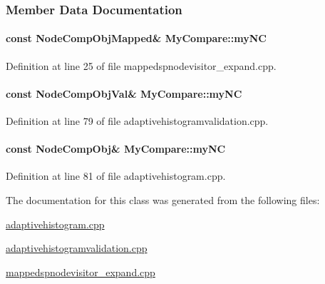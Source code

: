 \subsubsection{\-Member \-Data \-Documentation}
\hypertarget{classMyCompare_aa9f27ea198651dc3a8f2b3aaedc3b2ae}{
\paragraph[{my\-N\-C}]{\setlength{\rightskip}{0pt plus 5cm}const {\bf \-Node\-Comp\-Obj\-Mapped}\& {\bf \-My\-Compare\-::my\-N\-C}}}\label{classMyCompare_aa9f27ea198651dc3a8f2b3aaedc3b2ae}


\-Definition at line 25 of file mappedspnodevisitor\-\_\-expand.\-cpp.

\hypertarget{classMyCompare_aad6bdf9b44e3fbc16faaf3368b764515}{
\paragraph[{my\-N\-C}]{\setlength{\rightskip}{0pt plus 5cm}const {\bf \-Node\-Comp\-Obj\-Val}\& {\bf \-My\-Compare\-::my\-N\-C}}}\label{classMyCompare_aad6bdf9b44e3fbc16faaf3368b764515}


\-Definition at line 79 of file adaptivehistogramvalidation.\-cpp.

\hypertarget{classMyCompare_af0e29031d7490821548f19f8f993b297}{
\paragraph[{my\-N\-C}]{\setlength{\rightskip}{0pt plus 5cm}const {\bf \-Node\-Comp\-Obj}\& {\bf \-My\-Compare\-::my\-N\-C}}}\label{classMyCompare_af0e29031d7490821548f19f8f993b297}


\-Definition at line 81 of file adaptivehistogram.\-cpp.



\-The documentation for this class was generated from the following files\-:\begin{DoxyCompactItemize}
\item 
\hyperlink{adaptivehistogram_8cpp}{adaptivehistogram.\-cpp}\item 
\hyperlink{adaptivehistogramvalidation_8cpp}{adaptivehistogramvalidation.\-cpp}\item 
\hyperlink{mappedspnodevisitor__expand_8cpp}{mappedspnodevisitor\-\_\-expand.\-cpp}\end{DoxyCompactItemize}
